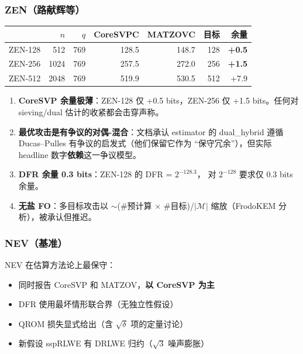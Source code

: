 \documentclass[11pt,a4paper]{ctexart}
\begin{document}
\subsubsection{ZEN（路献辉等）}

\begin{table}[htbp]\centering\small
\begin{tabular}{@{}lrrrrrr@{}}
\toprule
 & $n$ & $q$ & CoreSVPC & MATZOVC & 目标 & 余量 \\
\midrule
ZEN-128 & 512 & 769 & 128.5 & 148.7 & 128 & \textbf{+0.5} \\
ZEN-256 & 1024 & 769 & 257.5 & 272.0 & 256 & \textbf{+1.5} \\
ZEN-512 & 2048 & 769 & 519.9 & 530.5 & 512 & +7.9 \\
\bottomrule
\end{tabular}
\end{table}

\begin{gapbox}
\begin{enumerate}
\item \textbf{CoreSVP 余量极薄}：ZEN-128 仅 +0.5 bits，ZEN-256 仅
      +1.5 bits。任何对 sieving/dual 估计的收紧都会击穿声称。
\item \textbf{最优攻击是有争议的对偶-混合}：文档承认 estimator 的
      dual\_hybrid 遵循 Ducas--Pulles 有争议的启发式（他们保留它作为
      ``保守冗余''），但实际 headline 数字\textbf{依赖}这一争议模型。
\item \textbf{DFR 余量 0.3 bits}：ZEN-128 的 DFR = $2^{-128.3}$，
      对 $2^{-128}$ 要求仅 0.3 bits 余量。
\item \textbf{无盐 FO}：多目标攻击以 $\sim$(\#预计算 $\times$ \#目标)/$|\mathcal{M}|$
      缩放（FrodoKEM 分析），被承认但推迟。
\end{enumerate}
\end{gapbox}

\subsubsection{NEV（基准）}

NEV 在估算方法论上最保守：
\begin{itemize}
\item 同时报告 CoreSVP 和 MATZOV，\textbf{以 CoreSVP 为主}
\item DFR 使用最坏情形联合界（无独立性假设）
\item QROM 损失显式给出（含 $\sqrt{\delta}$ 项的定量讨论）
\item 新假设 sspRLWE 有 DRLWE 归约（$\sqrt{3}$ 噪声膨胀）
\end{itemize}
\end{document}
